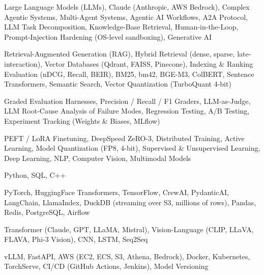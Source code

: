 \documentclass[letter,10pt]{article}
\begin{document}
 Large Language Models (LLMs), Claude (Anthropic, AWS Bedrock), Complex Agentic Systems, Multi-Agent Systems, Agentic AI Workflows, A2A Protocol, LLM Task Decomposition, Knowledge-Base Retrieval, Human-in-the-Loop, Prompt-Injection Hardening (OS-level sandboxing), Generative AI\par\vspace{2pt}

 Retrieval-Augmented Generation (RAG), Hybrid Retrieval (dense, sparse, late-interaction), Vector Databases (Qdrant, FAISS, Pinecone), Indexing \& Ranking Evaluation (nDCG, Recall, BEIR), BM25, bm42, BGE-M3, ColBERT, Sentence Transformers, Semantic Search, Vector Quantization (TurboQuant 4-bit)\par\vspace{2pt}

 Graded Evaluation Harnesses, Precision / Recall / F1 Graders, LLM-as-Judge, LLM Root-Cause Analysis of Failure Modes, Regression Testing, A/B Testing, Experiment Tracking (Weights \& Biases, MLflow)\par\vspace{2pt}

 PEFT / LoRA Finetuning, DeepSpeed ZeRO-3, Distributed Training, Active Learning, Model Quantization (FP8, 4-bit), Supervised \& Unsupervised Learning, Deep Learning, NLP, Computer Vision, Multimodal Models\par\vspace{2pt}

 Python, SQL, C++\par\vspace{2pt}

 PyTorch, HuggingFace Transformers, TensorFlow, CrewAI, PydanticAI, LangChain, LlamaIndex, DuckDB (streaming over S3, millions of rows), Pandas, Redis, PostgreSQL, Airflow\par\vspace{2pt}

 Transformer (Claude, GPT, LLaMA, Mistral), Vision-Language (CLIP, LLaVA, FLAVA, Phi-3 Vision), CNN, LSTM, Seq2Seq\par\vspace{2pt}

 vLLM, FastAPI, AWS (EC2, ECS, S3, Athena, Bedrock), Docker, Kubernetes, TorchServe, CI/CD (GitHub Actions, Jenkins), Model Versioning
\end{document}
